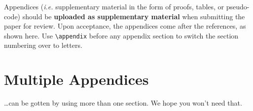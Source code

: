 Appendices ({\em i.e.} supplementary material in the form of proofs, tables,
or pseudo-code) should be {\bf uploaded as supplementary material} when submitting the paper for review.
Upon acceptance, the appendices come after the references, as shown here. Use
\verb|\appendix| before any appendix section to switch the section
numbering over to letters.

\section{Multiple Appendices}
\dots can be gotten by using more than one section. We hope you won't
need that.